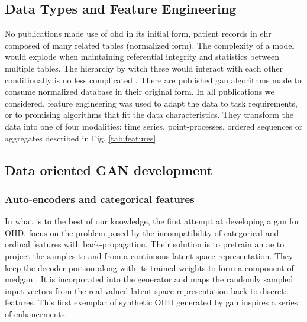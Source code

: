             

    \subsection{Data Types and Feature Engineering}

        No publications made use of \gls{ohd} in its initial form, patient records in \gls{ehr} composed of many related tables (normalized form). The complexity of a model would explode when maintaining referential integrity and statistics between multiple tables. The hierarchy by witch these would interact with each other conditionally is no less complicated \cite{Buda2015, Patki_2016, Zhang2015, Tay2013}. There are published \gls{gan} algorithms made to consume normalized database in their original form. In all publications we considered, feature engineering was used to adapt the data to task requirements, or to promising algorithms that fit the data characteristics. They transform the data into one of four modalities: time series, point-processes, ordered sequences or aggregates described in Fig. \ref{tab:features}.

        

    \subsection{Data oriented GAN development}\label{subsec:data_gan_dev}

        \subsubsection{Auto-encoders and categorical features}\label{subsubsec:categorical}

            In what is to the best of our knowledge, the first attempt at developing a \gls{gan} for OHD. \citeauthor{Choi2017-nt} focus on the problem posed by the incompatibility of categorical and ordinal features with back-propagation. Their solution is to pretrain an \gls{ae} to project the samples to and from a continuous latent space representation. They keep the decoder portion along with its trained weights to form a component of \gls{medgan} \cite{Choi2017-nt}. It is incorporated into the generator and maps the randomly sampled input vectors from the real-valued latent space representation back to discrete features. This first exemplar of synthetic OHD generated by \gls{gan} inspires a series of enhancements.\par
            
